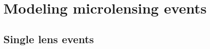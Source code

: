 \documentclass[12pt]{report}
\begin{document}
%

\chapter{Modeling microlensing events}
\label{ch:microlensing}
\section{Single lens events}
\end{document}
